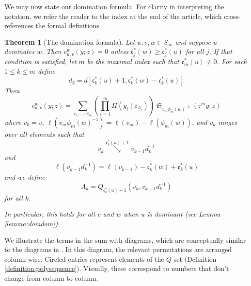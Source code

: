 \documentclass[reqno]{amsart}
\newtheorem{theorem}{Theorem}[section]
\theoremstyle{definition}
\theoremstyle{remark}
\numberwithin{equation}{subsection}
\DeclareMathOperator{\sch}{\mathfrak{S}}
\newcommand{\smpfu}{\mathsf{\Pi}}
\newcommand{\smpre}[2]{\ensuremath{}\smpfu\left( #1 \mid #2\right)}
\newcommand{\downvar}[1]{\stackrel{#1}{\searrow}}
\newcommand{\shifthom}{\tau}
\newcommand{\shiftvby}[1]{\shifthom^{#1}}
\newcommand{\code}{\mathfrak{c}}
\begin{document}




 We may now state our domination formula. For clarity in interpreting the notation, we refer the reader to the index at the end of the article, which cross-references the formal definitions.

\begin{theorem}[The domination formula] \label{theorem:dualpieri}
Let $u,v,w\in S_\infty$ and suppose $u$ dominates $w$. Then $c_{u,v}^w(y;z)=0$ unless $\code_j^*(w)\geq \code_j^*(u)$ for all $j$. If that condition is satisfied, let $m$ be the maximal index such that $\code_m^*(u)\neq 0$. For each $1\leq k\leq m$ define
$$d_k=d[\code_k^*(u)+1,\code^*_k(w)-\code_k^*(u)]$$
Then
$$c_{u,v}^w(y;z)=\sum_{v_1,\ldots,v_m} \left(\prod_{i=1}^m\smpre{y_i}{z_{A_i}}\right)\sch_{v_m\phi_m(w)^{-1}}(\shiftvby{m}y;z)$$
where $v_0=v$, $\ell(v_m\phi_m(w)^{-1})=\ell(v_m)-\ell(\phi_m(w))$, and $v_k$ ranges over all elements such that 
$$v_k\downvar{\code_k^*(u)+1}v_{k-1}d_k^{-1}$$
and
$$\ell(v_{k-1}d_k^{-1})=\ell(v_{k-1})-\code_k^*(w)+\code_k^*(u)$$
and we define
$$A_k = Q_{\code_k^*(u)+1}(v_k,v_{k-1}d_k^{-1})$$
for all $k$.

In particular, this holds for all $v$ and $w$ when $u$ is dominant (see Lemma \ref{lemma:domdom}).
\end{theorem}

We illustrate the terms in the sum with diagrams, which are conceptually similar to the diagrams in \cite{samuelmolev}. In this diagram, the relevant permutations are arranged column-wise. Circled entries represent elements of the $Q$ set (Definition \ref{definition:polysequence}). Visually, these correspond to numbers that don't change from column to column. 
\end{document}
